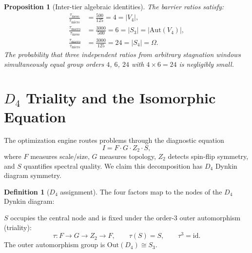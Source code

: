 \documentclass[11pt]{amsart}
\newtheorem{proposition}[theorem]{Proposition}
\theoremstyle{definition}
\newtheorem{definition}[theorem]{Definition}
\begin{document}
\begin{proposition}[Inter-tier algebraic identities]\label{prop:ratios}
The barrier ratios satisfy:
\begin{align}
\frac{\tau_{\mathrm{meso}}}{\tau_{\mathrm{micro}}} &= \frac{500}{125} = 4 = |V_4|, \label{eq:r1} \\
\frac{\tau_{\mathrm{macro}}}{\tau_{\mathrm{meso}}} &= \frac{3000}{500} = 6 = |S_3| = |\mathrm{Aut}(V_4)|, \label{eq:r2} \\
\frac{\tau_{\mathrm{macro}}}{\tau_{\mathrm{micro}}} &= \frac{3000}{125} = 24 = |S_4| = \Omega. \label{eq:r3}
\end{align}
The probability that three independent ratios from arbitrary stagnation windows simultaneously equal group orders $4$, $6$, $24$ with $4 \times 6 = 24$ is negligibly small.
\end{proposition}


\section{$D_4$ Triality and the Isomorphic Equation}
\label{sec:triality}

The optimization engine routes problems through the diagnostic equation
\begin{equation}\label{eq:I}
I = F \cdot G \cdot Z_2 \cdot S,
\end{equation}
where $F$ measures scale/size, $G$ measures topology, $Z_2$ detects spin-flip symmetry, and $S$ quantifies spectral quality. We claim this decomposition has $D_4$ Dynkin diagram symmetry.

\begin{definition}[$D_4$ assignment]
The four factors map to the nodes of the $D_4$ Dynkin diagram:
\begin{center}
\end{center}
$S$ occupies the central node and is fixed under the order-3 outer automorphism (triality):
\[
\tau: F \to G \to Z_2 \to F, \qquad \tau(S) = S, \qquad \tau^3 = \mathrm{id}.
\]
The outer automorphism group is $\mathrm{Out}(D_4) \cong S_3$.
\end{definition}
\end{document}
